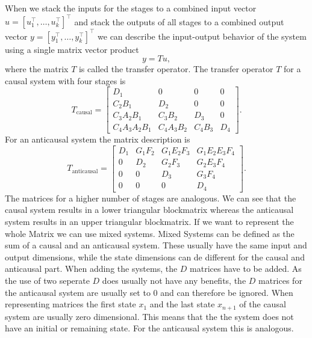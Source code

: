 \documentclass[doctype=mastersthesis,BCOR=15mm,biblatex]{ldvbook}%
\begin{document}
When we stack the inputs for the stages to a combined input vector $u = [u_1^\top, \dots ,u_k^\top]^\top$ and stack the outputs of all stages to a combined output vector $y = [y_1^\top, \dots ,y_k^\top]^\top$ we can describe the input-output behavior of the system using a single matrix vector product 
\begin{equation}\label{eq:System_mat_vec}
	y = Tu,
\end{equation}
where the matrix $T$ is called the transfer operator.
The transfer operator $T$ for a causal system with four stages is
\begin{equation}\label{eq:T_causal}
T_\text{causal}=
\begin{bmatrix}D_{1} & 0 & 0 & 0\\C_{2} B_{1} & D_{2} & 0 & 0\\
C_{3} A_{2} B_{1} & C_{3} B_{2} & D_{3} & 0\\
C_{4} A_{3} A_{2} B_{1} & C_{4} A_{3} B_{2} & C_{4} B_{3} & D_{4}\end{bmatrix}
.
\end{equation}
For an anticausal system the matrix description is 
\begin{equation}
T_{\text{anticausal}}=
\begin{bmatrix}D_{1} & G_{1} F_{2} & G_{1} E_{2} F_{3} & G_{1} E_{2} E_{3} F_{4}\\
0 & D_{2} & G_{2} F_{3} & G_{2} E_{3} F_{4}\\
0 & 0 & D_{3} & G_{3} F_{4}\\
0 & 0 & 0 & D_{4}\end{bmatrix}.
\end{equation}
The matrices for a higher number of stages are analogous.
We can see that the causal system results in a lower triangular blockmatrix whereas the anticausal system results in an upper triangular blockmatrix.
If we want to represent the whole Matrix we can use mixed systems.
Mixed Systems can be defined as the sum of a causal and an anticausal system.
These usually have the same input and output dimensions, while the state dimensions can de different for the causal and anticausal part.
When adding the systems,  the $D$ matrices have to be added.
As the use of two seperate $D$ does usually not have any benefits, the $D$ matrices for the anticausal system are usually set to 0 and can therefore be ignored.
When representing matrices the first state $x_1$ and the last state $x_{n+1}$ of the causal system are usually zero dimensional.
This means that the the system does not have an initial or remaining state.
For the anticausal system this is analogous.
\end{document}
